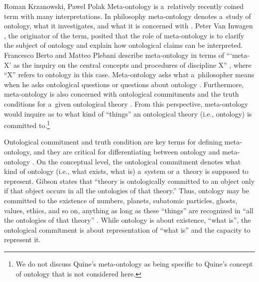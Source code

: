 \begin{artengenv2auth}{Roman Krzanowski, Pawel Polak}
Meta-ontology is a~relatively recently coined term with many interpretations. In philosophy meta-ontology denotes a~study of ontology, what it investigates, and what it is concerned with
\parencites[e.g.,][]{quine_word_1960}[][]{eklund_picture_2008}[][]{berto_ontology_2015}. %
 Peter Van Inwagen 
\parencite*[][]{van_inwagen_meta-ontology_1998}, %
 the originator of the term, posited that the role of meta-ontology is to clarify the subject of ontology and explain how ontological claims can be interpreted. Francesco Berto and Matteo Plebani describe meta-ontology in terms of ``‘meta-X' as the inquiry on the central concepts and procedures of discipline X'' 
\parencite[][p.13]{berto_ontology_2015}, %
 where ``X'' refers to ontology in this case. Meta-ontology asks what a~philosopher means when he asks ontological questions or questions about ontology 
\parencites[][]{eklund_picture_2008}[][]{turner_metaontology_2014}. %
 Furthermore, meta-ontology is also concerned with ontological commitments and the truth conditions for a~given ontological theory 
\parencite[][]{van_inwagen_meta-ontology_1998}. %
 From this perspective, meta-ontology would inquire as to what kind of ``things'' an ontological theory (i.e., ontology) is committed to.\footnote{We do not discuss Quine's meta-ontology as being specific to Quine's concept of ontology that is not considered here.}

Ontological commitment and truth condition are key terms for defining meta-ontology, and they are critical for differentiating between ontology and meta-ontology
\parencite[][]{turner_metaontology_2014}. %
 On the conceptual level, the ontological commitment denotes what kind of ontology (i.e., what exists, what is) a~system or a~theory is supposed to represent. Gibson 
\parencite*[][p.631]{gibson_ontological_2009} %
 states that ``theory is ontologically committed to an object only if that object occurs in all the ontologies of that theory.'' Thus, ontology may be committed to the existence of numbers, planets, subatomic particles, ghosts, values, ethics, and so on, anything as long as these ``things'' are recognized in ``all the ontologies of that theory'' 
\parencite[e.g.,][]{eklund_picture_2008}. %
 While ontology is about existence, ``what is'', the ontological commitment is about representation of ``what is'' 
\parencite[][]{smith_origin_1998} %
 and the capacity to represent it.


\end{artengenv2auth}
